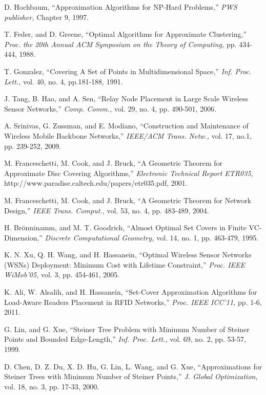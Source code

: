 \documentclass[journal]{IEEEtran}
\begin{document}
\begin{thebibliography}{1}
D. Hochbaum, ``Approximation Algorithms for NP-Hard Problems,'' {\it PWS publisher,} Chapter 9, 1997.

T. Feder, and D. Greene, ``Optimal Algorithms for Approximate Clustering,'' {\it Proc. the
20th Annual ACM Symposium on the Theory of Computing,} pp. 434-444, 1988.

T. Gonzalez, ``Covering A Set of Points in Multidimensional Space,'' {\it Inf. Proc. Lett.,} vol. 40,
no. 4, pp.181-188, 1991.

J. Tang, B. Hao, and A. Sen, ``Relay Node Placement in Large Scale Wireless Sensor Networks,''
{\it Comp. Comm.,} vol. 29, no. 4, pp. 490-501, 2006.

A. Srinivas, G. Zussman, and E. Modiano, ``Construction and Maintenance of Wireless Mobile Backbone
Networks,'' {\it IEEE/ACM Trans. Netw.,} vol. 17, no.1, pp. 239-252, 2009.

M. Franceschetti, M. Cook, and J. Bruck, ``A Geometric Theorem for Approximate Disc Covering Algorithms,''
{\it Electronic Technical Report ETR035,} http://www.paradise.caltech.edu/papers/etr035.pdf, 2001.

M. Franceschetti, M. Cook, and J. Bruck, ``A Geometric Theorem for Network Design,'' {\it IEEE Trans. Comput.,}
vol. 53, no. 4, pp. 483-489, 2004.

H. Br\"{o}nninamm, and M. T. Goodrich, ``Almost Optimal Set Covers in Finite VC-Dimension,'' {\it Discrete
Computational Geometry,} vol. 14, no. 1, pp. 463-479, 1995.

K. N. Xu, Q. H. Wang, and H. Hassanein, ``Optimal Wireless Sensor Networks (WSNs) Deployment:
Minimum Cost with Lifetime Constraint,'' {\it Proc. IEEE WiMob'05,} vol. 3, pp. 454-461, 2005.

K. Ali, W. Alsalih, and H. Hassanein, ``Set-Cover Approximation Algorithms for Load-Aware Readers Placement in
RFID Networks,'' {\it Proc. IEEE ICC'11,} pp. 1-6, 2011.

G. Lin, and G. Xue, ``Steiner Tree Problem with Minimum Number of Steiner Points and Bounded Edge-Length,''
{\it Inf. Proc. Lett.,} vol. 69, no. 2, pp. 53-57, 1999.

D. Chen, D. Z. Du, X. D. Hu, G. Lin, L. Wang, and G. Xue, ``Approximations for Steiner Trees with Minimum Number
of Steiner Points,'' {\it J. Global Optimization,} vol. 18, no. 3, pp. 17-33, 2000.


\end{thebibliography}
\end{document}
